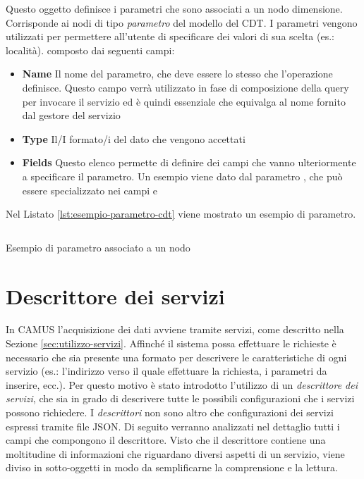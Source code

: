 Questo oggetto definisce i parametri che sono associati a un nodo dimensione. Corrisponde ai nodi di tipo \emph{parametro} del modello del CDT. I parametri vengono utilizzati per permettere all'utente di specificare dei valori di sua scelta (es.: località). \upe composto dai seguenti campi:

\begin{itemize}
	\item \textbf{Name} Il nome del parametro, che deve essere lo stesso che l'operazione definisce. Questo campo verrà utilizzato in fase di composizione della query per invocare il servizio ed è quindi essenziale che equivalga al nome fornito dal gestore del servizio
	\item \textbf{Type} Il/I formato/i del dato che vengono accettati
	\item \textbf{Fields} Questo elenco permette di definire dei campi che vanno ulteriormente a specificare il parametro. Un esempio viene dato dal parametro , che può essere specializzato nei campi  e 
\end{itemize}

Nel Listato \ref{lst:esempio-parametro-cdt} viene mostrato un esempio di parametro.

\begin{listing}[H]
	\inputminted{json}{5-implementazione-backend/Codice/esempio_parametro_cdt.json}
	\caption{Esempio di parametro associato a un nodo}
	\label{lst:esempio-parametro-cdt}
\end{listing}

\section{Descrittore dei servizi\label{sec:descrittore-servizi}}

In CAMUS l'acquisizione dei dati avviene tramite servizi, come descritto nella Sezione \ref{sec:utilizzo-servizi}. Affinché il sistema possa effettuare le richieste è necessario che sia presente una formato per descrivere le caratteristiche di ogni servizio (es.: l'indirizzo verso il quale effettuare la richiesta, i parametri da inserire, ecc.). Per questo motivo è stato introdotto l'utilizzo di un \emph{descrittore dei servizi}, che sia in grado di descrivere tutte le possibili configurazioni che i servizi possono richiedere. I \emph{descrittori} non sono altro che configurazioni dei servizi espressi tramite file JSON. Di seguito verranno analizzati nel dettaglio tutti i campi che compongono il descrittore. Visto che il descrittore contiene una moltitudine di informazioni che riguardano diversi aspetti di un servizio, viene diviso in sotto-oggetti in modo da semplificarne la comprensione e la lettura.

